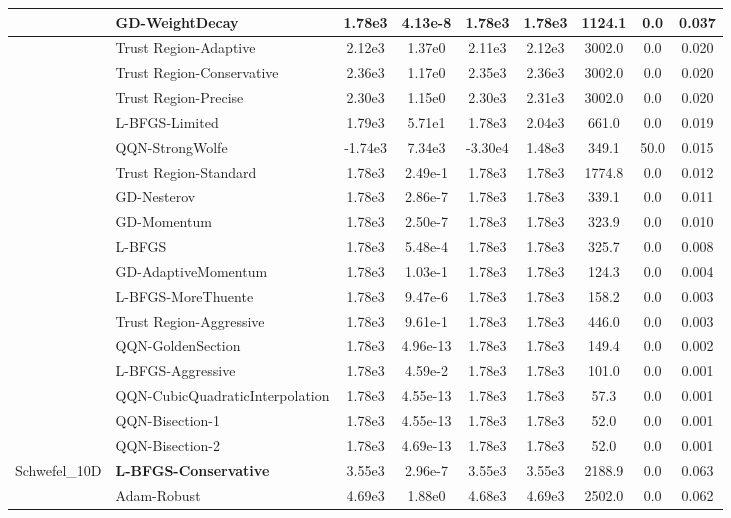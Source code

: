 \documentclass{article}
\begin{document}
\begin{longtable}{|l|l|c|c|c|c|c|c|c|}
\hline
 & GD-WeightDecay & 1.78e3 & 4.13e-8 & 1.78e3 & 1.78e3 & 1124.1 & 0.0 & 0.037 \\
\hline
 & Trust Region-Adaptive & 2.12e3 & 1.37e0 & 2.11e3 & 2.12e3 & 3002.0 & 0.0 & 0.020 \\
\hline
 & Trust Region-Conservative & 2.36e3 & 1.17e0 & 2.35e3 & 2.36e3 & 3002.0 & 0.0 & 0.020 \\
\hline
 & Trust Region-Precise & 2.30e3 & 1.15e0 & 2.30e3 & 2.31e3 & 3002.0 & 0.0 & 0.020 \\
\hline
 & L-BFGS-Limited & 1.79e3 & 5.71e1 & 1.78e3 & 2.04e3 & 661.0 & 0.0 & 0.019 \\
\hline
 & QQN-StrongWolfe & -1.74e3 & 7.34e3 & -3.30e4 & 1.48e3 & 349.1 & 50.0 & 0.015 \\
\hline
 & Trust Region-Standard & 1.78e3 & 2.49e-1 & 1.78e3 & 1.78e3 & 1774.8 & 0.0 & 0.012 \\
\hline
 & GD-Nesterov & 1.78e3 & 2.86e-7 & 1.78e3 & 1.78e3 & 339.1 & 0.0 & 0.011 \\
\hline
 & GD-Momentum & 1.78e3 & 2.50e-7 & 1.78e3 & 1.78e3 & 323.9 & 0.0 & 0.010 \\
\hline
 & L-BFGS & 1.78e3 & 5.48e-4 & 1.78e3 & 1.78e3 & 325.7 & 0.0 & 0.008 \\
\hline
 & GD-AdaptiveMomentum & 1.78e3 & 1.03e-1 & 1.78e3 & 1.78e3 & 124.3 & 0.0 & 0.004 \\
\hline
 & L-BFGS-MoreThuente & 1.78e3 & 9.47e-6 & 1.78e3 & 1.78e3 & 158.2 & 0.0 & 0.003 \\
\hline
 & Trust Region-Aggressive & 1.78e3 & 9.61e-1 & 1.78e3 & 1.78e3 & 446.0 & 0.0 & 0.003 \\
\hline
 & QQN-GoldenSection & 1.78e3 & 4.96e-13 & 1.78e3 & 1.78e3 & 149.4 & 0.0 & 0.002 \\
\hline
 & L-BFGS-Aggressive & 1.78e3 & 4.59e-2 & 1.78e3 & 1.78e3 & 101.0 & 0.0 & 0.001 \\
\hline
 & QQN-CubicQuadraticInterpolation & 1.78e3 & 4.55e-13 & 1.78e3 & 1.78e3 & 57.3 & 0.0 & 0.001 \\
\hline
 & QQN-Bisection-1 & 1.78e3 & 4.55e-13 & 1.78e3 & 1.78e3 & 52.0 & 0.0 & 0.001 \\
\hline
 & QQN-Bisection-2 & 1.78e3 & 4.69e-13 & 1.78e3 & 1.78e3 & 52.0 & 0.0 & 0.001 \\
Schwefel\_10D & \textbf{L-BFGS-Conservative} & 3.55e3 & 2.96e-7 & 3.55e3 & 3.55e3 & 2188.9 & 0.0 & 0.063 \\
\hline
 & Adam-Robust & 4.69e3 & 1.88e0 & 4.68e3 & 4.69e3 & 2502.0 & 0.0 & 0.062 \\

\end{longtable}
\end{document}

